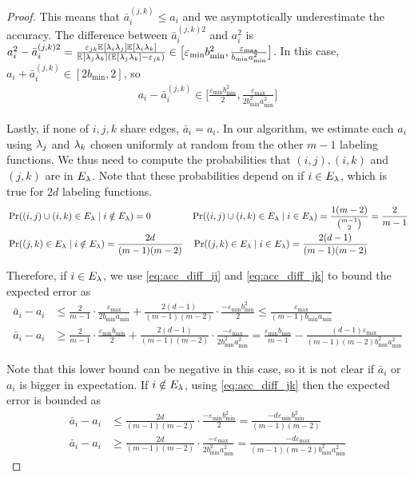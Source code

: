 \begin{proof}
This means that $\bar{a}_i^{(j, k)} \le a_i$ and we asymptotically underestimate the accuracy. The difference between $\bar{a}_i^{(j, k) 2}$ and $a_i^2$ is $a_i^2 - \bar{a}_i^{(j, k) 2}  = \frac{\varepsilon_{jk} \mathbb{E}_{}\left[\lambda_i \lambda_j\right] \mathbb{E}_{}\left[\lambda_i \lambda_k\right]}{\mathbb{E}_{}\left[\lambda_j \lambda_k\right](\mathbb{E}_{}\left[\lambda_j \lambda_k\right] - \varepsilon_{jk})} \in \big[\varepsilon_{\min} b_{\min}^2, \frac{\varepsilon_{\max}}{b_{\min}a_{\min}^2} \big]$. In this case, $a_i + \bar{a}_i^{(j, k)} \in [2b_{\min}, 2]$, so 
\begin{align}
a_i - \bar{a}_i^{(j, k)} \in \Big[\frac{\varepsilon_{\min} b_{\min}^2}{2}, \frac{\varepsilon_{\max}}{2b_{\min}^2 a_{\min}^2} \Big]
\label{eq:acc_diff_jk}
\end{align}

Lastly, if none of $i, j, k$ share edges, $\bar{a}_i = a_i$. In our algorithm, we estimate each $a_i$ using $\lambda_j$ and $\lambda_k$ chosen uniformly at random from the other $m - 1$ labeling functions. We thus need to compute the probabilities that $(i, j), (i, k)$ and $(j, k)$ are in $E_{\lambda}$. Note that these probabilities depend on if $i \in E_{\lambda}$, which is true for $2d$ labeling functions. 
\begin{align}
    &\Pr((i, j) \cup (i, k) \in E_{\lambda} \; | \; i \notin E_{\lambda}) = 0 \qquad \qquad \; \Pr((i, j) \cup (i, k) \in E_{\lambda} \; | \; i \in E_{\lambda}) = \frac{1(m - 2)}{{m - 1 \choose 2}} =  \frac{2}{m - 1} \nonumber \\
    &\Pr((j, k) \in E_{\lambda} \;| \; i \notin E_{\lambda}) = \frac{2d}{(m - 1)(m - 2)}  \quad \Pr((j, k) \in E_{\lambda} \;| \; i \in E_{\lambda}) = \frac{2(d - 1)}{(m - 1)(m - 2)} \nonumber
\end{align} 

Therefore, if $i \in E_{\lambda}$, we use \eqref{eq:acc_diff_ij} and \eqref{eq:acc_diff_jk} to bound the expected error as
\begin{align*}
\bar{a}_i - a_i &\le \frac{2}{m - 1} \cdot \frac{\varepsilon_{\max}}{2b_{\min} a_{\min}} + \frac{2(d - 1)}{(m - 1)(m - 2)} \cdot \frac{-\varepsilon_{\min} b_{\min}^2}{2} \le \frac{\varepsilon_{\max}}{(m - 1) b_{\min} a_{\min}} \\
\bar{a}_i - a_i &\ge \frac{2}{m - 1} \cdot \frac{\varepsilon_{\min} b_{\min}}{2} + \frac{2(d - 1)}{(m - 1)(m - 2)} \cdot \frac{-\varepsilon_{\max}}{2 b_{\min}^2 a_{\min}^2} = \frac{\varepsilon_{\min} b_{\min}}{m - 1} - \frac{(d - 1)\varepsilon_{\max}}{(m - 1)(m - 2)b^2_{\min} a^2_{\min}}
\end{align*}

Note that this lower bound can be negative in this case, so it is not clear if $\bar{a}_i$ or $a_i$ is bigger in expectation. If $i \notin E_{\lambda}$, using \eqref{eq:acc_diff_jk} then the expected error is bounded as
\begin{align*}
\bar{a}_i - a_i &\le \frac{2d}{(m - 1)(m - 2)} \cdot \frac{-\varepsilon_{\min} b_{\min}^2}{2} = \frac{-d\varepsilon_{\min} b_{\min}^2 }{(m - 1)(m - 2)}  \\
\bar{a}_i - a_i &\ge \frac{2d}{(m - 1)(m - 2)}  \cdot \frac{-\varepsilon_{\max}}{2 b_{\min}^2 a_{\min}^2} = \frac{-d \varepsilon_{\max}}{(m - 1)(m - 2) b_{\min}^2 a_{\min}^2} 
\end{align*}


\end{proof}
